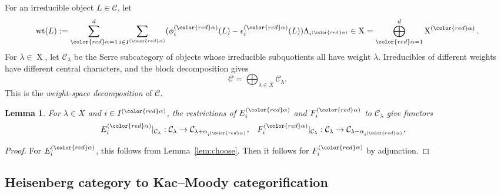 \documentclass[12pt]{amsart}
\numberwithin{itemcounter}{subsection}
\theoremstyle{plain}
\newtheorem{lemma}[theorem]{Lemma}
\theoremstyle{definition}
\theoremstyle{remark}
\numberwithin{equation}{section}
\def\scrI{{I}}
\def\X{\operatorname{X}\nolimits}
\def\wt{\operatorname{wt}\nolimits}
\def\wt{{\operatorname{wt}}}
\def\red#1{{\color{red} #1}}
\begin{document}
For an irreducible object $L \in \mathcal{C}$, let
\begin{equation*}
	\wt(L) := \sum_{\red{\alpha}=1}^d\sum_{i \in \scrI^{(\red{\alpha})}} (\phi^{(\red{\alpha})}_i(L)-\epsilon^{(\red{\alpha})}_i(L)) \Lambda_{i^{(\red{\alpha})}} \in \X=\bigoplus_{\red{\alpha}=1}^d \X^{(\red{\alpha})}.
\end{equation*}
For $\lambda\in\X$, let $\mathcal C_\lambda$ be the Serre subcategory of
objects whose irreducible subquotients all have weight $\lambda$.
Irreducibles of different weights have different central characters, and the
block decomposition gives
\begin{equation*}
	\textstyle
	\mathcal{C} =
	\bigoplus_{\lambda \in X} \mathcal{C}_\lambda  .
\end{equation*}
This is the {\em weight-space decomposition} of $\mathcal{C}$.

\begin{lemma}\label{pg}
	For $\lambda \in X$ and $i \in \scrI^{(\red{\alpha})}$, the
	restrictions of $E^{(\red{\alpha})}_i$ and $F^{(\red{\alpha})}_i$ to $\mathcal{C}_\lambda$ give functors
	\begin{align*}
		E^{(\red{\alpha})}_i|_{\mathcal{C}_\lambda}&:\mathcal{C}_\lambda \rightarrow \mathcal{C}_{\lambda+\alpha_{i^{(\red{\alpha})}}},&
		F^{(\red{\alpha})}_i|_{\mathcal{C}_\lambda}&:\mathcal{C}_\lambda \rightarrow \mathcal{C}_{\lambda-\alpha_{i^{(\red{\alpha})}}},
	\end{align*}
\end{lemma}

\begin{proof}
	For $E^{(\red{\alpha})}_i$, this follows from Lemma~\ref{lem:choose}.
	Then it follows for $F^{(\red{\alpha})}_i$ by adjunction.
\end{proof}
\medskip

\subsection{Heisenberg category to Kac--Moody categorification}
\end{document}
